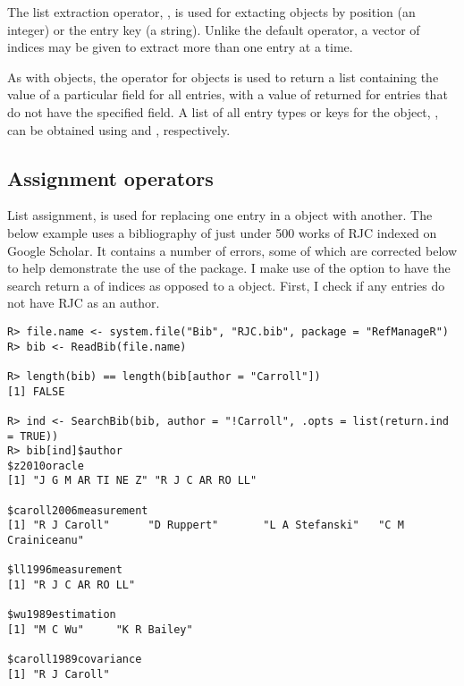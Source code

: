 \documentclass[article]{jss}\usepackage[]{graphicx}\usepackage[]{color}
\makeatletter
\newenvironment{kframe}{%
 \def\at@end@of@kframe{}%
 \ifinner\ifhmode%
  \def\at@end@of@kframe{\end{minipage}}%
  \begin{minipage}{\columnwidth}%
 \fi\fi%
 \def\FrameCommand##1{\hskip\@totalleftmargin \hskip-\fboxsep
 \colorbox{shadecolor}{##1}\hskip-\fboxsep
     \hskip-\linewidth \hskip-\@totalleftmargin \hskip\columnwidth}%
 \MakeFramed {\advance\hsize-\width
   \@totalleftmargin\z@ \linewidth\hsize
   \@setminipage}}%
 {\par\unskip\endMakeFramed%
 \at@end@of@kframe}
\newenvironment{knitrout}{}{} %
\newcommand{\bt}{\`{}}
\makeatother
\begin{document}
The list extraction operator, \code{\bt[[\bt}, is used for extacting  objects by position (an integer) or the entry key (a string).  Unlike the default operator, a vector of indices may be given to extract more than one entry at a time.

As with  objects, the \code{\bt$\bt} operator for  objects is used to return a list containing the value of a particular field for all entries, with a value of  returned for entries that do not have the specified field.  A list of all entry types or keys for the  object, , can be obtained using  and , respectively.
\subsection{Assignment operators} 
List assignment, \code{\bt[[<-\bt} is used for replacing one entry in a  object with another.  The below example uses a bibliography of just under 500 works of RJC indexed on Google Scholar.  It contains a number of errors, some of which are corrected below to help demonstrate the use of the package.  I make use of the  option  to have the search return a  of indices as opposed to a  object.  First, I check if any entries do not have RJC as an author.
\begin{knitrout}
\color{fgcolor}\begin{kframe}
\begin{verbatim}
R> file.name <- system.file("Bib", "RJC.bib", package = "RefManageR")
R> bib <- ReadBib(file.name)

R> length(bib) == length(bib[author = "Carroll"])
[1] FALSE

R> ind <- SearchBib(bib, author = "!Carroll", .opts = list(return.ind = TRUE))
R> bib[ind]$author
$z2010oracle
[1] "J G M AR TI NE Z" "R J C AR RO LL"  

$caroll2006measurement
[1] "R J Caroll"      "D Ruppert"       "L A Stefanski"   "C M Crainiceanu"

$ll1996measurement
[1] "R J C AR RO LL"

$wu1989estimation
[1] "M C Wu"     "K R Bailey"

$caroll1989covariance
[1] "R J Caroll"
\end{verbatim}
\end{kframe}
\end{knitrout}
\end{document}
